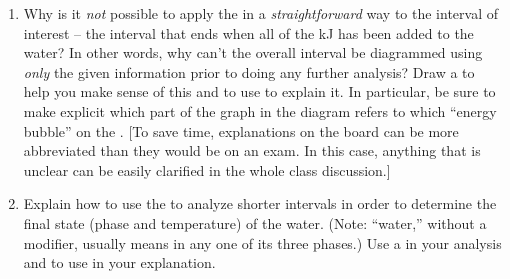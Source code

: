 \begin{enumerate}[1.]

	\item Why is it \emph{not} possible to apply the \textbf{\EnergyInteractionModel{}} in a {\em straightforward} way to the interval of interest -- the interval that ends when all of the \unit[252]{kJ} has been added to the water? In other words, why can't the overall interval be diagrammed using {\em only} the given information prior to doing any further analysis?   Draw a \TempGraph{} to help you make sense of this and to use to explain it. In particular, be sure to make explicit which part of the graph in the diagram refers to which ``energy bubble'' on the \EnergyDiagram{}. [To save time, explanations on the board can be more abbreviated than they would be on an exam. In this case, anything that is unclear can be easily clarified in the whole class discussion.]
	
	\item Explain how to use the \textbf{\EnergyInteractionModel{}} to analyze shorter intervals in order to determine the final state (phase and temperature) of the water.  (Note: ``water,'' without a modifier, usually means  in any one of its three phases.) Use a \TempGraph{} in your analysis and to use in your explanation.

\WCD 

\end{enumerate}
